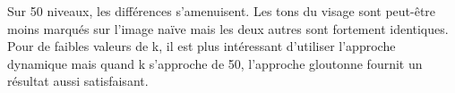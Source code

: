 \documentclass[a4paper, 12pt]{article}
\begin{document}
    Sur 50 niveaux, les différences s'amenuisent. Les tons du visage sont peut-être moins marqués sur l'image naïve mais les deux autres sont fortement identiques. Pour de faibles valeurs de k, il est plus intéressant d'utiliser l'approche dynamique mais quand k s'approche de 50, l'approche gloutonne fournit un résultat aussi satisfaisant.
\end{document}
